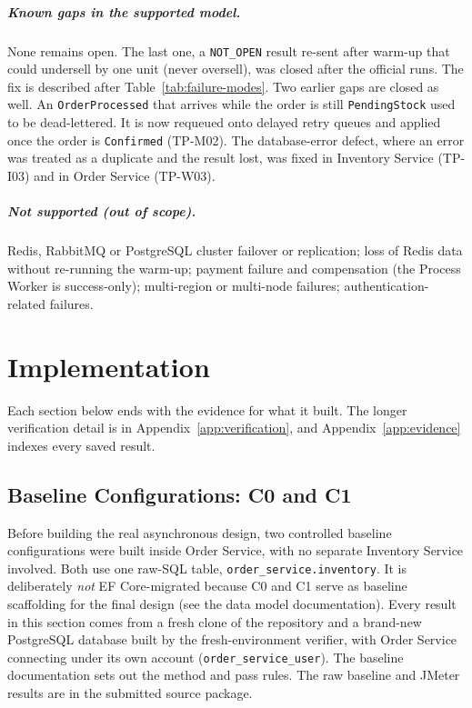 \documentclass[a4paper]{report}
\begin{document}
\paragraph{Known gaps in the supported model.} None remains open. The last one, a \texttt{NOT\_OPEN} result re-sent after warm-up that could undersell by one unit (never oversell), was closed after the official runs. The fix is described after Table~\ref{tab:failure-modes}. Two earlier gaps are closed as well. An \texttt{OrderProcessed} that arrives while the order is still
\texttt{PendingStock} used to be dead-lettered. It is now requeued
onto delayed retry queues and applied once the order is \texttt{Confirmed}
(TP-M02). The
database-error defect, where an error was treated as a duplicate and the result
lost, was fixed in Inventory Service (TP-I03) and in Order Service
(TP-W03).

\paragraph{Not supported (out of scope).} Redis, RabbitMQ or PostgreSQL
cluster failover or replication; loss of Redis data without re-running the
warm-up; payment failure and compensation (the Process Worker is
success-only); multi-region or multi-node failures; authentication-related
failures.

\chapter{Implementation}
\label{sec:implementation}
Each section below ends with the evidence for what it built. The longer
verification detail is in Appendix~\ref{app:verification}, and
Appendix~\ref{app:evidence} indexes every saved result.

\section{Baseline Configurations: C0 and C1}
\label{sec:c0-c1}

Before building the real asynchronous design, two controlled
baseline configurations were built inside Order Service, with no separate
Inventory Service involved. Both use one raw-SQL table,
\texttt{order\_service.inventory}. It is deliberately \emph{not}
EF Core-migrated because C0 and C1 serve as baseline scaffolding for the final
design (see the data model documentation). Every result in this section
comes from a fresh clone of the repository and a brand-new PostgreSQL
database built by the fresh-environment verifier, with Order Service
connecting under its own account (\texttt{order\_service\_user}). The baseline
documentation sets out the method and pass rules. The raw baseline and JMeter
results are in the submitted source package.
\end{document}
